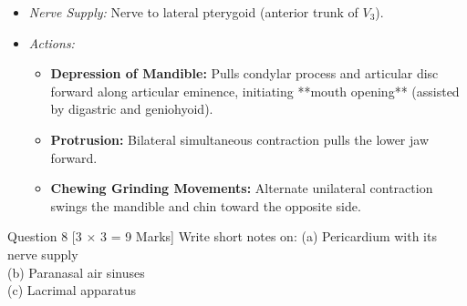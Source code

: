 \documentclass[11pt,a4paper]{article}
\begin{document}
\begin{ansbox}
\begin{enumerate}[leftmargin=*]
\begin{itemize}
        \item \textit{Nerve Supply:} Nerve to lateral pterygoid (anterior trunk of $V_3$).
        \item \textit{Actions:}
        \begin{itemize}
            \item \textbf{Depression of Mandible:} Pulls condylar process and articular disc forward along articular eminence, initiating **mouth opening** (assisted by digastric and geniohyoid).
            \item \textbf{Protrusion:} Bilateral simultaneous contraction pulls the lower jaw forward.
            \item \textbf{Chewing Grinding Movements:} Alternate unilateral contraction swings the mandible and chin toward the opposite side.
        \end{itemize}
    \end{itemize}
\end{enumerate}
\end{ansbox}

\begin{qbox}{Question 8 [3 $\times$ 3 = 9 Marks]}
Write short notes on:
(a) Pericardium with its nerve supply \\
(b) Paranasal air sinuses \\
(c) Lacrimal apparatus
\end{qbox}
\end{document}
